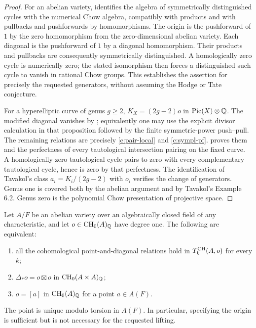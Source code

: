 \begin{proof}
For an abelian variety, \citet[Theorem 6.2.5 and Corollary 6.2.6]{c_osullivan2011} identifies the algebra of symmetrically distinguished cycles with the numerical Chow algebra, compatibly with products and with pullbacks and pushforwards by homomorphisms. The origin is the pushforward of $1$ by the zero homomorphism from the zero-dimensional abelian variety. Each diagonal is the pushforward of $1$ by a diagonal homomorphism. Their products and pullbacks are consequently symmetrically distinguished. A homologically zero cycle is numerically zero; the stated isomorphism then forces a distinguished such cycle to vanish in rational Chow groups. This establishes the assertion for precisely the requested generators, without assuming the Hodge or Tate conjecture.

For a hyperelliptic curve of genus $g\geq2$, $K_X=(2g-2)o$ in $\operatorname{Pic}(X)\otimes\mathbb Q$. The modified diagonal vanishes by \citet[Proposition 4.8 and its relation with the cycle on $X^3$ in \S4]{c_grossschoen1995}; equivalently one may use the explicit divisor calculation in that proposition followed by the finite symmetric-power push--pull. The remaining relations are precisely \eqref{c:pair-local} and \eqref{c:sympl-pf}. \citet[\S6, equation (2), and Corollary 6.4]{c_tavakol2018} proves them and the perfectness of every tautological intersection pairing on the fixed curve. A homologically zero tautological cycle pairs to zero with every complementary tautological cycle, hence is zero by that perfectness. The identification of Tavakol's class $a_i=K_i/(2g-2)$ with $o_i$ verifies the change of generators. Genus one is covered both by the abelian argument and by Tavakol's Example 6.2. Genus zero is the polynomial Chow presentation of projective space.
\end{proof}

\begin{theorem}
\label{c:abelian-point-classification}
Let $A/F$ be an abelian variety over an algebraically closed field of any characteristic, and let $o\in\operatorname{CH}_0(A)_\mathbb Q$ have degree one. The following are equivalent:
\begin{enumerate}[label=(\roman*)]
\item all the cohomological point-and-diagonal relations hold in $T_k^{\operatorname{CH}}(A,o)$ for every $k$;
\item $\Delta_*o=o\boxtimes o$ in $\operatorname{CH}_0(A\times A)_\mathbb Q$;
\item $o=[a]$ in $\operatorname{CH}_0(A)_\mathbb Q$ for a point $a\in A(F)$.
\end{enumerate}
The point is unique modulo torsion in $A(F)$. In particular, specifying the origin is sufficient but is not necessary for the requested lifting.
\end{theorem}

